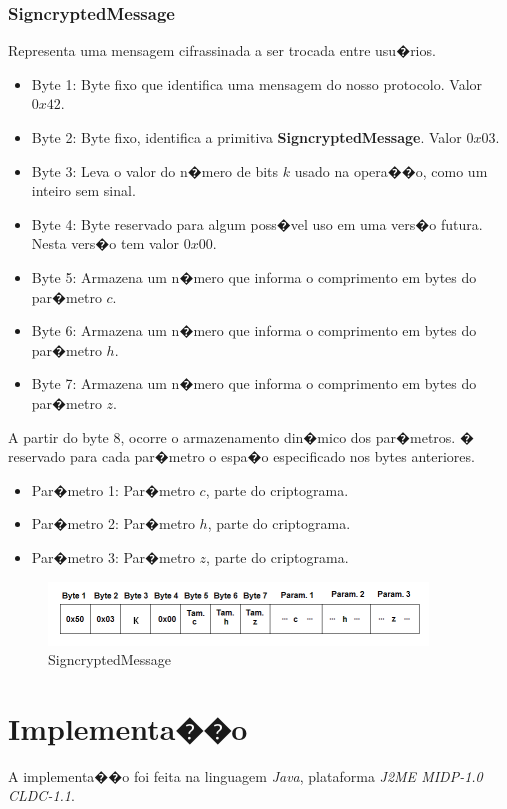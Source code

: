 \documentclass[a4paper,capchap,espacoduplo,normaltoc]{abntepusp}
\begin{document}
\subsection{SigncryptedMessage}
Representa uma mensagem cifrassinada a ser trocada entre usu�rios.

\begin{itemize}
	\item Byte 1: Byte fixo que identifica uma mensagem do nosso protocolo. Valor $0x42$.
	\item Byte 2: Byte fixo, identifica a primitiva \textbf{SigncryptedMessage}. Valor $0x03$.
	\item Byte 3: Leva o valor do n�mero de bits $k$ usado na opera��o, como um inteiro sem sinal.
	\item Byte 4: Byte reservado para algum poss�vel uso em uma vers�o futura. Nesta vers�o tem valor $0x00$.	
	\item Byte 5: Armazena um n�mero que informa o comprimento em bytes do par�metro $c$.
	\item Byte 6: Armazena um n�mero que informa o comprimento em bytes do par�metro $h$.
	\item Byte 7: Armazena um n�mero que informa o comprimento em bytes do par�metro $z$.
\end{itemize}	
A partir do byte 8, ocorre o armazenamento din�mico dos par�metros. � reservado para cada par�metro o espa�o especificado nos bytes anteriores.
\begin{itemize}
	\item Par�metro 1: Par�metro $c$, parte do criptograma.
	\item Par�metro 2: Par�metro $h$, parte do criptograma.
	\item Par�metro 3: Par�metro $z$, parte do criptograma.	
\end{itemize}

\begin{figure}[h]
	\centering
		\includegraphics{figuras/signcryptedmessage.PNG}
	\caption{SigncryptedMessage}
	\label{fig:signcryptedmessage}
\end{figure}

\chapter{Implementa��o}
%
%
A implementa��o foi feita na linguagem \emph{Java}, plataforma \emph{J2ME MIDP-1.0 CLDC-1.1}.
\end{document}
